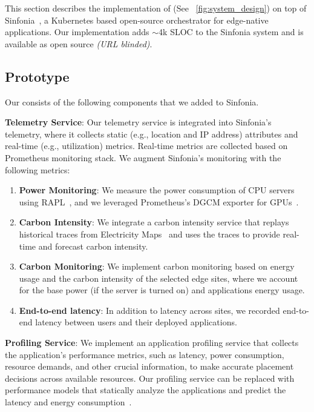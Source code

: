 This section describes the implementation of \proposedsystem (See ~\autoref{fig:system_design}) on top of Sinfonia~\cite{satyanarayanan2022sinfonia}, a Kubernetes based open-source orchestrator for edge-native applications. Our implementation adds $\sim$4k SLOC to the  Sinfonia system and is available as open source \emph{(URL blinded)}. 

\subsection{\proposedsystem Prototype}
\noindent Our \proposedsystem consists of the following components that we added to Sinfonia.

\noindent\textbf{Telemetry Service}:
Our telemetry service is integrated into Sinfonia’s telemetry, where it collects static (e.g., location and IP address) attributes and real-time  (e.g., utilization) metrics. Real-time metrics are collected based on Prometheus monitoring stack\cite{Prometheus}. We augment Sinfonia's monitoring with the following metrics:
\begin{enumerate}[leftmargin=*]
    \item \textbf{Power Monitoring}: We measure the power consumption of CPU servers using RAPL~\cite{david2010rapl}, and we leveraged Prometheus's DGCM exporter for GPUs~\cite{nvidia_dcgm_exporter_github}. 

    \item \textbf{Carbon Intensity}: We integrate a carbon intensity service that replays historical traces from Electricity Maps~\cite{electricity-map} and uses the traces to provide real-time and forecast carbon intensity.

    \item \textbf{Carbon Monitoring}: We implement carbon monitoring based on energy usage and the carbon intensity of the selected edge sites, where we account for the base power (if the server is turned on) and applications energy usage. 
    
    \item \textbf{End-to-end latency}: In addition to latency across sites, we recorded end-to-end latency between users and their deployed applications.

\end{enumerate}

\noindent\textbf{Profiling Service}: 
We implement an application profiling service that collects the application's performance metrics, such as latency, power consumption, resource demands, and other crucial information, to make accurate placement decisions across available resources. Our profiling service can be replaced with performance models that statically analyze the applications and predict the latency and energy consumption~\cite{paleo, cai2017neuralpower}.

